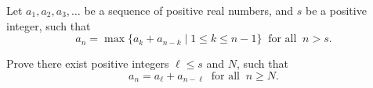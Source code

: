 Let $a_1, a_2, a_3, \ldots$ be a sequence of positive real numbers, and $s$ be a positive integer, such that\[a_n = \max \{ a_k + a_{n-k} \mid 1 \leq k \leq n-1 \} \ \textrm{ for all } \ n > s.\]

Prove there exist positive integers $\ell \leq s$ and $N$,  such that\[a_n = a_{\ell} + a_{n - \ell} \ \textrm{ for all } \ n \geq N.\]
